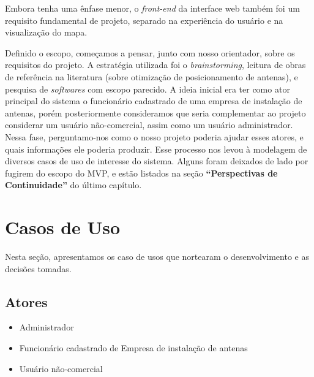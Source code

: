 \documentclass[]{politex}
\begin{document}
Embora tenha uma ênfase menor, o \textit{front-end} da interface web também foi
um requisito fundamental de projeto, separado na experiência do usuário e na
visualização do mapa.

Definido o escopo, começamos a pensar, junto com nosso orientador, sobre os
requisitos do projeto. A estratégia utilizada foi o \textit{brainstorming},
leitura de obras de referência na literatura (sobre otimização de posicionamento
de antenas), e pesquisa de \textit{softwares} com escopo parecido. A ideia
inicial era ter como ator principal do sistema o funcionário cadastrado de uma
empresa de instalação de antenas, porém posteriormente consideramos que seria
complementar ao projeto considerar um usuário não-comercial, assim como um
usuário administrador. Nessa fase, perguntamo-nos como o nosso projeto poderia
ajudar esses atores, e quais informações ele poderia produzir. Esse processo nos
levou à modelagem de diversos casos de uso de interesse do sistema. Alguns foram
deixados de lado por fugirem do escopo do MVP, e estão listados na seção
\textbf{``Perspectivas de Continuidade''} do último capítulo.

\section{Casos de Uso}

Nesta seção, apresentamos os caso de usos que nortearam o desenvolvimento e as
decisões tomadas.

\newcommand{\usecase}[1]{\refstepcounter{usecasecounter}\label{usecase:#1}
\arabic{usecasecounter}}

\subsection{Atores}
\begin{itemize}
\item Administrador
\item Funcionário cadastrado de Empresa de instalação de antenas
\item Usuário não-comercial
\end{itemize}
\end{document}
